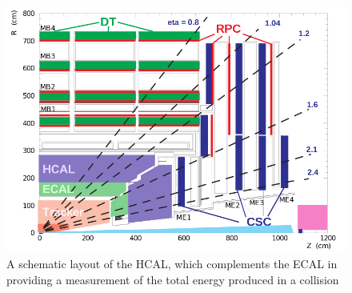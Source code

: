 \begin{figure}[htbp]
\includegraphics[width=\textwidth]{pdfs/experiment/cms_muon.png}
\caption{
 A schematic layout of the HCAL, which complements the ECAL
  in providing a measurement of the total energy produced 
  in a collision
 }
\label{fig:muon}
\end{figure}
 


